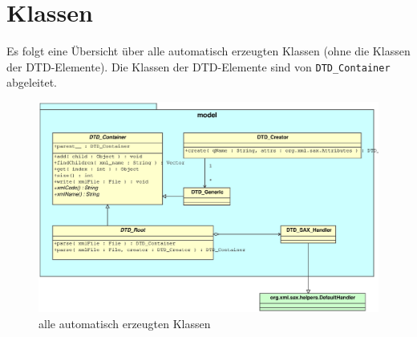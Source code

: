 \documentclass [a4paper,12pt] {scrartcl}
\newcommand{\DTD}{{\sffamily\small DTD}}
\begin{document}
\newpage
\section{Klassen}
Es folgt eine {\"U}bersicht {\"u}ber alle automatisch erzeugten Klassen
(ohne die Klassen der \DTD-Elemente). Die Klassen der \DTD-Elemente
sind von \texttt{DTD\_Container} abgeleitet.
\begin{figure}[ht!]
\centerline{\includegraphics[width=1.1 \linewidth]{dtd2.eps}}
\caption{alle automatisch erzeugten Klassen}
\label{fig:dtd2java-dtd2}
\end{figure}
\end{document}
